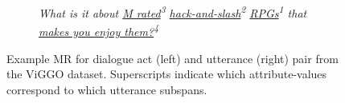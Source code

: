 \begin{figure}
{\begin{subfigure}{0.26\textwidth}
    \end{subfigure}\hfill\begin{subfigure}{0.19\textwidth}
        \textit{What is it about \ul{M rated}\textsuperscript{3} 
            \ul{hack-and-slash}\textsuperscript{2} \ul{RPGs}\textsuperscript{1}
            that \ul{makes you enjoy them?}\textsuperscript{4}}
    \end{subfigure}
}

\caption{%
    Example MR for  dialogue act (left) and utterance (right) pair from the ViGGO
    dataset. Superscripts indicate which attribute-values correspond to which
    utterance subspans.}
\label{fig:examples}
\end{figure}

